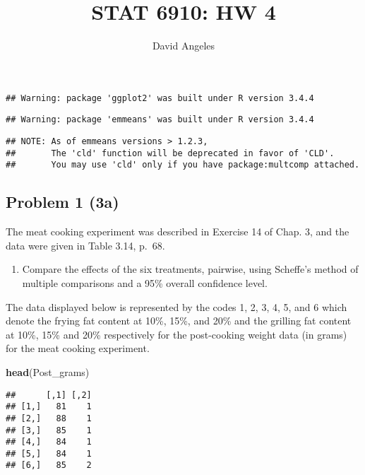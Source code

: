 \documentclass[12pt,]{article}
\title{STAT 6910: HW 4}
\author{David Angeles}
\date{}
\newenvironment{Shaded}{\begin{snugshade}}{\end{snugshade}}
\newcommand{\KeywordTok}[1]{\textcolor[rgb]{0.13,0.29,0.53}{\textbf{#1}}}
\newcommand{\NormalTok}[1]{#1}
\providecommand{\tightlist}{%
  \setlength{\itemsep}{0pt}\setlength{\parskip}{0pt}}
\begin{document}
\maketitle

\begin{verbatim}
## Warning: package 'ggplot2' was built under R version 3.4.4
\end{verbatim}

\begin{verbatim}
## Warning: package 'emmeans' was built under R version 3.4.4
\end{verbatim}

\begin{verbatim}
## NOTE: As of emmeans versions > 1.2.3,
##       The 'cld' function will be deprecated in favor of 'CLD'.
##       You may use 'cld' only if you have package:multcomp attached.
\end{verbatim}

\subsection{Problem 1 (3a)}\label{problem-1-3a}

The meat cooking experiment was described in Exercise 14 of Chap. 3, and
the data were given in Table 3.14, p.~68.

\begin{enumerate}
\def\labelenumi{(\alph{enumi})}
\tightlist
\item
  Compare the effects of the six treatments, pairwise, using Scheffe's
  method of multiple comparisons and a 95\% overall confidence level.
\end{enumerate}

The data displayed below is represented by the codes 1, 2, 3, 4, 5, and
6 which denote the frying fat content at 10\%, 15\%, and 20\% and the
grilling fat content at 10\%, 15\% and 20\% respectively for the
post-cooking weight data (in grams) for the meat cooking experiment.

\begin{Shaded}
\begin{Highlighting}[]
\KeywordTok{head}\NormalTok{(Post_grams) }
\end{Highlighting}
\end{Shaded}

\begin{verbatim}
##      [,1] [,2]
## [1,]   81    1
## [2,]   88    1
## [3,]   85    1
## [4,]   84    1
## [5,]   84    1
## [6,]   85    2
\end{verbatim}
\end{document}
